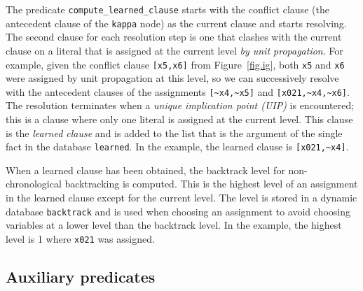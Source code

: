 \documentclass[11pt]{article}
\newcommand*{\p}[1]{\textup{\texttt{#1}}}
\begin{document}
The predicate \p{compute\_learned\_clause} starts with the conflict
clause (the antecedent clause of the \p{kappa} node) as the current
clause and starts resolving. The second clause for each resolution step
is one that clashes with the current clause on a literal that is
assigned at the current level \emph{by unit propagation}. For example,
given the conflict clause \p{[x5,x6]} from Figure~\ref{fig.ig}, both
\p{x5} and \p{x6} were assigned by unit propagation at this level, so we
can successively resolve with the antecedent clauses of the assignments
\verb+[~x4,~x5]+ and \verb+[x021,~x4,~x6]+. The resolution terminates
when a \emph{unique implication point (UIP)} is encountered; this is a
clause where only one literal is assigned at the current level. This
clause is the \emph{learned clause} and is added to the list that is the
argument of the single fact in the database \p{learned}. In the example,
the learned clause is \verb+[x021,~x4]+.

When a learned clause has been obtained, the backtrack level for
non-chronological backtracking is computed. This is the highest level of
an assignment in the learned clause except for the current level. The
level is stored in a dynamic database \p{backtrack} and is used when
choosing an assignment to avoid choosing variables at a lower level than
the backtrack level. In the example, the highest level is 1 where
\p{x021} was assigned.


\subsection{Auxiliary predicates}
\end{document}
